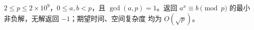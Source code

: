 $2\le p\le 2\times 10^9$，$0\le a,b<p$，且 $\gcd(a,p)=1$。返回
$a^x\equiv b\pmod p$ 的最小非负解，无解返回 $-1$；期望时间、空间复杂度
均为 $O(\sqrt p)$。
